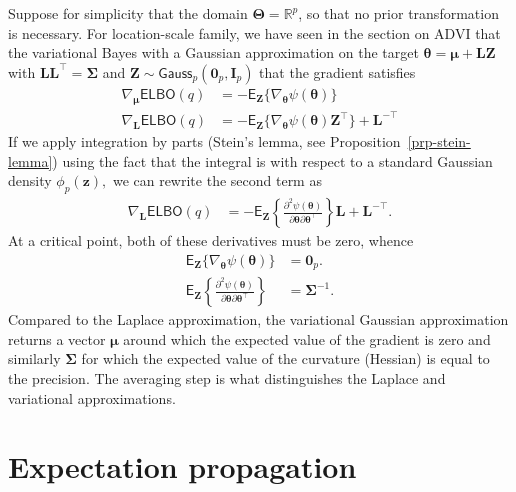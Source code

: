 \documentclass[
  11pt,
  letterpaper,
]{scrbook}
\theoremstyle{definition}
\theoremstyle{plain}
\theoremstyle{plain}
\theoremstyle{plain}
\theoremstyle{definition}
\theoremstyle{definition}
\theoremstyle{plain}
\theoremstyle{plain}
\theoremstyle{remark}
\begin{document}
Suppose for simplicity that the domain
\(\boldsymbol{\Theta}=\mathbb{R}^p\), so that no prior transformation is
necessary. For location-scale family, we have seen in the section on
ADVI that the variational Bayes with a Gaussian approximation on the
target
\(\boldsymbol{\theta} = \boldsymbol{\mu} + \mathbf{L}\boldsymbol{Z}\)
with \(\mathbf{LL}^\top=\boldsymbol{\Sigma}\) and
\(\boldsymbol{Z} \sim \mathsf{Gauss}_p(\boldsymbol{0}_p, \mathbf{I}_p)\)
that the gradient satisfies \begin{align*}
 \nabla_{\boldsymbol{\mu}}\mathsf{ELBO}(q)&= -\mathsf{E}_{\boldsymbol{Z}}\{\nabla_{\boldsymbol{\theta}}\psi(\boldsymbol{\theta})\} \\
 \nabla_{\mathbf{L}}\mathsf{ELBO}(q)&= -\mathsf{E}_{\boldsymbol{Z}}\{\nabla_{\boldsymbol{\theta}}\psi(\boldsymbol{\theta})\boldsymbol{Z}^\top\} + \mathbf{L}^{-\top}
\end{align*} If we apply integration by parts (Stein's lemma, see
Proposition~\ref{prp-stein-lemma}) using the fact that the integral is
with respect to a standard Gaussian density \(\phi_p(\boldsymbol{z}),\)
we can rewrite the second term as \begin{align*}
  \nabla_{\mathbf{L}}\mathsf{ELBO}(q)&= -\mathsf{E}_{\boldsymbol{Z}}\left\{ \frac{\partial^2 \psi(\boldsymbol{\theta})}{\partial \boldsymbol{\theta} \partial \boldsymbol{\theta}^\top}\right\}\mathbf{L} + \mathbf{L}^{-\top}.
\end{align*} At a critical point, both of these derivatives must be
zero, whence \begin{align*}
 \mathsf{E}_{\boldsymbol{Z}}\{\nabla_{\boldsymbol{\theta}}\psi(\boldsymbol{\theta})\} &= \boldsymbol{0}_p. \\
 \mathsf{E}_{\boldsymbol{Z}}\left\{ \frac{\partial^2 \psi(\boldsymbol{\theta})}{\partial \boldsymbol{\theta} \partial \boldsymbol{\theta}^\top}\right\} &= \boldsymbol{\Sigma}^{-1}.
\end{align*} Compared to the Laplace approximation, the variational
Gaussian approximation returns a vector \(\boldsymbol{\mu}\) around
which the expected value of the gradient is zero and similarly
\(\boldsymbol{\Sigma}\) for which the expected value of the curvature
(Hessian) is equal to the precision. The averaging step is what
distinguishes the Laplace and variational approximations.

\section{Expectation propagation}\label{expectation-propagation-1}
\end{document}
